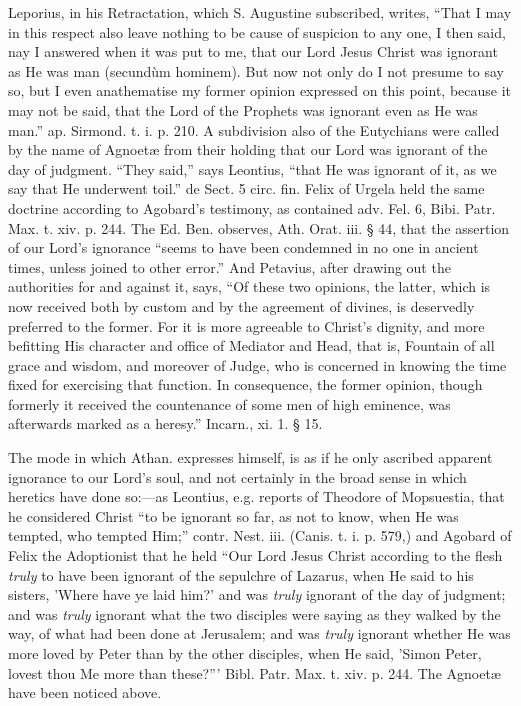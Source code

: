 Leporius, in his Retractation, which S. Augustine
subscribed, writes, ``That I may in this respect also leave nothing
to be cause of suspicion to any one, I then said, nay I answered when
it was put to me, that our Lord Jesus Christ was ignorant as He was
man (secundùm hominem). But now not only do I not presume to say so,
but I even anathematise my former opinion expressed on this point,
because it may not be said, that the Lord of the Prophets was ignorant
even as He was man.'' ap. Sirmond. t. i. p. 210. A subdivision
also of the Eutychians were called by the name of Agnoetæ from their
holding that our Lord was ignorant of the day of judgment. ``They
said,'' says Leontius, ``that He was ignorant of it, as we say that
He underwent toil.'' de Sect. 5 circ. fin. Felix of Urgela held the
same doctrine according to Agobard's testimony, as contained adv.
Fel. 6, Bibi. Patr. Max. t. xiv. p. 244. The Ed. Ben. observes, Ath.
Orat. iii. § 44, that the assertion of our Lord's ignorance ``seems to have been condemned in no one in ancient times, unless
joined to other error.'' And Petavius, after drawing out the
authorities for and against it, says, ``Of these two opinions, the
latter, which is now received both by custom and by the agreement of
divines, is deservedly preferred to the former. For it is more
agreeable to Christ's dignity, and more befitting His character and
office of Mediator and Head, that is, Fountain of all grace and
wisdom, and moreover of Judge, who is concerned in knowing the time
fixed for exercising that function. In consequence, the former
opinion, though formerly it received the countenance of some men of
high eminence, was afterwards marked as a heresy.'' Incarn., xi. 1.
§ 15.

The mode in which Athan. expresses himself, is as
if he only ascribed apparent ignorance to our Lord's soul, and not
certainly in the broad sense in which heretics have done so:—as
Leontius, e.g. reports of Theodore of Mopsuestia, that he considered
Christ ``to be ignorant so far, as not to know, when He was tempted,
who tempted Him;'' contr. Nest. iii. (Canis. t. i. p. 579,) and
Agobard of Felix the Adoptionist that he held ``Our Lord Jesus Christ
according to the flesh \emph{truly} to have been ignorant of the
sepulchre of Lazarus, when He said to his sisters, 'Where have ye laid
him?' and was \emph{truly} ignorant of the day of judgment; and was \emph{truly}
ignorant what the two disciples were saying as they walked by the way,
of what had been done at Jerusalem; and was \emph{truly} ignorant
whether He was more loved by Peter than by the other disciples, when
He said, 'Simon Peter, lovest thou Me more than these?''' Bibl. Patr.
Max. t. xiv. p. 244. The Agnoetæ have been noticed above.

